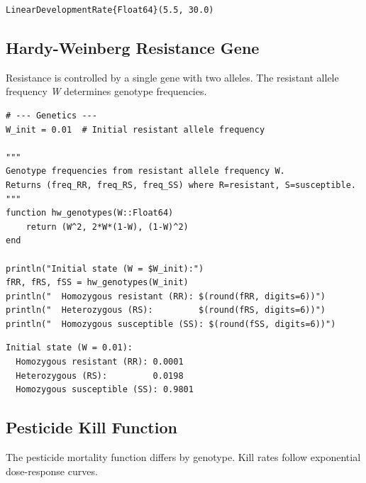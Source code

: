 \begin{verbatim}
LinearDevelopmentRate{Float64}(5.5, 30.0)
\end{verbatim}



\subsection{Hardy-Weinberg Resistance Gene}



\label{5282736845722407833}{}


Resistance is controlled by a single gene with two alleles. The resistant allele frequency \emph{W} determines genotype frequencies.




\begin{verbatim}
# --- Genetics ---
W_init = 0.01  # Initial resistant allele frequency

"""
Genotype frequencies from resistant allele frequency W.
Returns (freq_RR, freq_RS, freq_SS) where R=resistant, S=susceptible.
"""
function hw_genotypes(W::Float64)
    return (W^2, 2*W*(1-W), (1-W)^2)
end

println("Initial state (W = $W_init):")
fRR, fRS, fSS = hw_genotypes(W_init)
println("  Homozygous resistant (RR): $(round(fRR, digits=6))")
println("  Heterozygous (RS):         $(round(fRS, digits=6))")
println("  Homozygous susceptible (SS): $(round(fSS, digits=6))")
\end{verbatim}




\begin{verbatim}
Initial state (W = 0.01):
  Homozygous resistant (RR): 0.0001
  Heterozygous (RS):         0.0198
  Homozygous susceptible (SS): 0.9801
\end{verbatim}



\subsection{Pesticide Kill Function}



\label{1213215234935095051}{}


The pesticide mortality function differs by genotype. Kill rates follow exponential dose-response curves.




